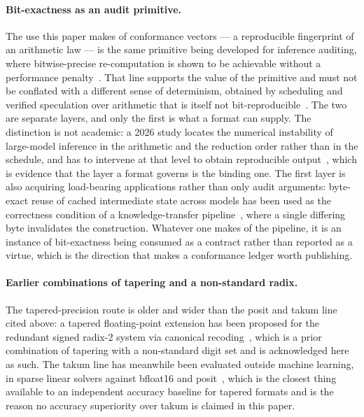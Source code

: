 \paragraph{Bit-exactness as an audit primitive.} The use this paper makes of
conformance vectors --- a reproducible fingerprint of an arithmetic law --- is the
same primitive being developed for inference auditing, where bitwise-precise
re-computation is shown to be achievable without a performance
penalty~\cite{cankaya2026}. That line supports the value of the primitive and
must not be conflated with a different sense of determinism, obtained by
scheduling and verified speculation over arithmetic that is itself not
bit-reproducible~\cite{gond2026llm42}. The two are separate layers, and only the
first is what a format can supply. The distinction is not academic: a 2026 study
locates the numerical instability of large-model inference in the arithmetic and
the reduction order rather than in the schedule, and has to intervene at that
level to obtain reproducible output~\cite{zhu2026heal}, which is evidence that the
layer a format governs is the binding one. The first layer is also acquiring load-bearing
applications rather than only audit arguments: byte-exact reuse of cached
intermediate state across models has been used as the correctness condition of a
knowledge-transfer pipeline~\cite{schelpe2026grafting}, where a single differing
byte invalidates the construction. Whatever one makes of the pipeline, it is an
instance of bit-exactness being consumed as a contract rather than reported as a
virtue, which is the direction that makes a conformance ledger worth publishing.

\paragraph{Earlier combinations of tapering and a non-standard radix.} The
tapered-precision route is older and wider than the posit and takum line cited
above: a tapered floating-point extension has been proposed for the redundant
signed radix-2 system via canonical recoding~\cite{schoenbaum2021}, which is a
prior combination of tapering with a non-standard digit set and is acknowledged
here as such. The takum line has meanwhile been evaluated outside machine
learning, in sparse linear solvers against bfloat16 and posit~\cite{hunhold2024sparse},
which is the closest thing available to an independent accuracy baseline for
tapered formats and is the reason no accuracy superiority over takum is claimed
in this paper.

